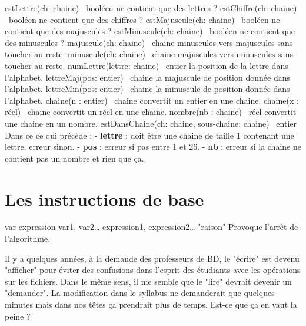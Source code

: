 	\begin{Pseudocode}
		\Stmt estLettre(ch: chaine) \Gives~booléen		\RComment ne contient que des lettres ?
		\Stmt estChiffre(ch: chaine) \Gives~booléen		\RComment ne contient que des chiffres ?
		\Stmt estMajuscule(ch: chaine) \Gives~booléen	\RComment ne contient que des majuscules ?
		\Stmt estMinuscule(ch: chaine) \Gives~booléen	\RComment ne contient que des minuscules ? 
		\Empty
		\Stmt majuscule(ch: chaine) \Gives~chaine		\RComment minuscules vers majuscules sans toucher au reste.
		\Stmt minuscule(ch: chaine) \Gives~chaine		\RComment majuscules vers minuscules sans toucher au reste.
		\Stmt numLettre(lettre: chaine) \Gives~entier	\RComment la position de la lettre dans l'alphabet.
		\Stmt lettreMaj(pos: entier) \Gives~chaine		\RComment la majuscule de position donnée dans l'alphabet.
		\Stmt lettreMin(pos: entier) \Gives~chaine		\RComment la minuscule de position donnée dans l'alphabet.
		\Stmt chaine(n : entier) \Gives~chaine			\RComment convertit un entier en une chaine.
		\Stmt chaine(x : réel) \Gives~chaine			\RComment convertit un réel en une chaine.
		\Stmt nombre(nb : chaine) \Gives~réel			\RComment convertit une chaine en un nombre.
		\Empty
		\Stmt estDansChaine(ch: chaine, sous-chaine: chaine) \Gives~entier 
		\Stmt 											{}
		\Empty
		\LComment Dans ce ce qui précède :
		\LComment - \textbf{lettre} : doit être une chaine de taille 1 contenant une lettre. erreur sinon.
		\LComment - \textbf{pos} : erreur si pas entre 1 et 26.
		\LComment - \textbf{nb} : erreur si la chaine ne contient pas un nombre et rien que ça.
	\end{Pseudocode}

\section{Les instructions de base}

	\begin{Pseudocode}
	\Let var \Gets expression
	\Rea var1, var2\dots
	\Write expression1, expression2\dots
	\Error "raison" \Comment Provoque l'arrêt de l'algorithme.
	\end{Pseudocode}

	\begin{Note}
	Il y a quelques années, à la demande des professeurs de BD,
	le "écrire" est devenu "afficher" pour éviter des confusions
	dans l'esprit des étudiants avec les opérations sur les fichiers. 
	Dans le même sens, il me semble que le "lire" devrait
	devenir un "demander". 
	La modification dans le syllabus ne demanderait que quelques
	minutes mais dans nos têtes ça prendrait plus de temps.
	Est-ce que ça en vaut la peine ?
	\end{Note}

